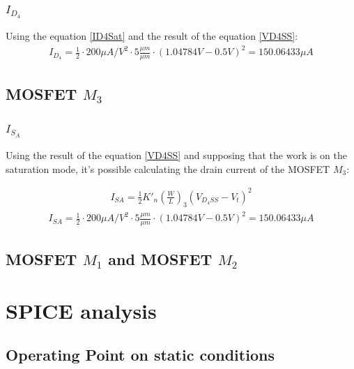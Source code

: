\documentclass[10pt,a4paper]{book}
\begin{document}
\subsubsection{$I_{D_4}$}
Using the equation \ref{ID4Sat} and the result of the equation \ref{VD4SS}:
\begin{align}
I_{D_4} = \frac{1}{2}\cdot 200 \mu A/V^2\cdot 5 \frac{\mu m}{\mu m} \cdot \left(1.04784V -0.5V \right)^2 = 150.06433 \mu A \label{ID4Sat}
\end{align}

\subsection{MOSFET $M_3$}
\subsubsection{$I_{S_A}$}
Using the result of the equation \ref{VD4SS} and supposing that the work is on the saturation mode, it's possible calculating the drain current of the MOSFET $M_3$:

\begin{align}
I_{SA} = \frac{1}{2}{K'}_n \left(\frac{W}{L}\right)_3 (V_{D_4SS} - V_t)^2
\end{align}
\begin{align}
I_{SA} = \frac{1}{2}\cdot 200 \mu A/V^2\cdot 5 \frac{\mu m}{\mu m} \cdot \left(1.04784V -0.5V \right)^2 = 150.06433 \mu A \label{ISASat}
\end{align}

\subsection{MOSFET $M_1$ and MOSFET $M_2$}



\section{SPICE analysis}
\subsection{Operating Point on static conditions}


\end{document}
